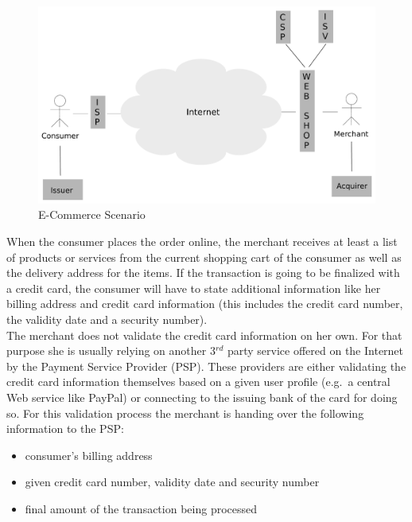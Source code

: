 \begin{figure}[H]
	\centering
		\includegraphics[width=0.8\columnwidth]{images/e-commerce-scenario.pdf}
	\caption{E-Commerce Scenario}
\label{fig:images_ecommerce_scenario}
\end{figure}

When the consumer places the order online, the merchant receives at least a list of products or services from the current shopping cart of the consumer as well as the delivery address for the items. If the transaction is going to be finalized with a credit card, the consumer will have to state additional information like her billing address and credit card information (this includes the credit card number, the validity date and a security number). \\
The merchant does not validate the credit card information on her own. For that purpose she is usually relying on another 3$^{rd}$ party service offered on the Internet by the Payment Service Provider (PSP). These providers are either validating the credit card information themselves based on a given user profile (e.g.\ a central Web service like PayPal) or connecting to the issuing bank of the card for doing so. For this validation process the merchant is handing over the following information to the PSP:\@

\begin{itemize}
    \item consumer's billing address
    \item given credit card number, validity date and security number
    \item final amount of the transaction being processed
\end{itemize}

